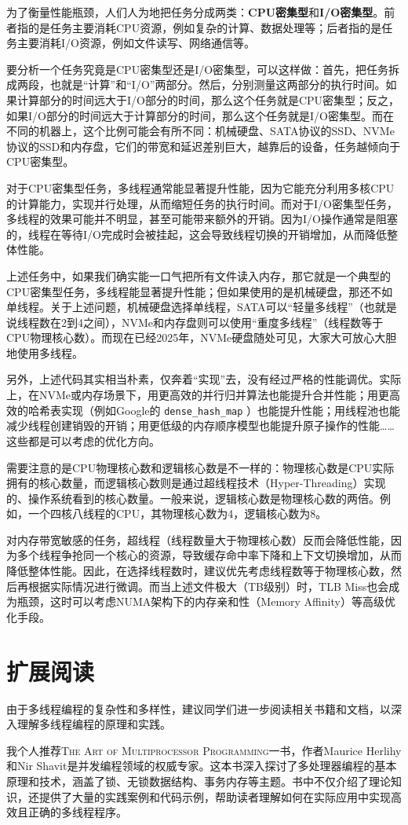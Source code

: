 为了衡量性能瓶颈，人们人为地把任务分成两类：\textbf{CPU密集型}和\textbf{I/O密集型}。前者指的是任务主要消耗CPU资源，例如复杂的计算、数据处理等；后者指的是任务主要消耗I/O资源，例如文件读写、网络通信等。

要分析一个任务究竟是CPU密集型还是I/O密集型，可以这样做：首先，把任务拆成两段，也就是“计算”和“I/O”两部分。然后，分别测量这两部分的执行时间。如果计算部分的时间远大于I/O部分的时间，那么这个任务就是CPU密集型；反之，如果I/O部分的时间远大于计算部分的时间，那么这个任务就是I/O密集型。而在不同的机器上，这个比例可能会有所不同：机械硬盘、SATA协议的SSD、NVMe协议的SSD和内存盘，它们的带宽和延迟差别巨大，越靠后的设备，任务越倾向于CPU密集型。

对于CPU密集型任务，多线程通常能显著提升性能，因为它能充分利用多核CPU的计算能力，实现并行处理，从而缩短任务的执行时间。而对于I/O密集型任务，多线程的效果可能并不明显，甚至可能带来额外的开销。因为I/O操作通常是阻塞的，线程在等待I/O完成时会被挂起，这会导致线程切换的开销增加，从而降低整体性能。

上述任务中，如果我们确实能一口气把所有文件读入内存，那它就是一个典型的CPU密集型任务，多线程能显著提升性能；但如果使用的是机械硬盘，那还不如单线程。关于上述问题，机械硬盘选择单线程，SATA可以“轻量多线程”（也就是说线程数在2到4之间），NVMe和内存盘则可以使用“重度多线程”（线程数等于CPU物理核心数）。而现在已经2025年，NVMe硬盘随处可见，大家大可放心大胆地使用多线程。

另外，上述代码其实相当朴素，仅奔着“实现”去，没有经过严格的性能调优。实际上，在NVMe或内存场景下，用更高效的并行归并算法也能提升合并性能；用更高效的哈希表实现（例如Google的 \texttt{dense\_hash\_map} ）也能提升性能；用线程池也能减少线程创建销毁的开销；用更低级的内存顺序模型也能提升原子操作的性能……这些都是可以考虑的优化方向。

需要注意的是CPU物理核心数和逻辑核心数是不一样的：物理核心数是CPU实际拥有的核心数量，而逻辑核心数则是通过超线程技术（Hyper-Threading）实现的、操作系统看到的核心数量。一般来说，逻辑核心数是物理核心数的两倍。例如，一个四核八线程的CPU，其物理核心数为4，逻辑核心数为8。

对内存带宽敏感的任务，超线程（线程数量大于物理核心数）反而会降低性能，因为多个线程争抢同一个核心的资源，导致缓存命中率下降和上下文切换增加，从而降低整体性能。因此，在选择线程数时，建议优先考虑线程数等于物理核心数，然后再根据实际情况进行微调。而当上述文件极大（TB级别）时，TLB Miss也会成为瓶颈，这时可以考虑NUMA架构下的内存亲和性（Memory Affinity）等高级优化手段。

\section{扩展阅读}

由于多线程编程的复杂性和多样性，建议同学们进一步阅读相关书籍和文档，以深入理解多线程编程的原理和实践。

我个人推荐\textsc{The Art of Multiprocessor Programming}一书，作者Maurice Herlihy和Nir Shavit是并发编程领域的权威专家。这本书深入探讨了多处理器编程的基本原理和技术，涵盖了锁、无锁数据结构、事务内存等主题。书中不仅介绍了理论知识，还提供了大量的实践案例和代码示例，帮助读者理解如何在实际应用中实现高效且正确的多线程程序。
